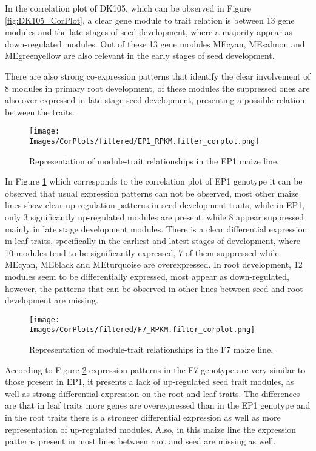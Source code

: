 \documentclass[
]{article}
\begin{document}
In the correlation plot of DK105, which can be observed in Figure \ref{fig:DK105_CorPlot}, a
clear gene module to trait relation is between 13 gene modules and the
late stages of seed development, where a majority appear as
down-regulated modules. Out of these 13 gene modules MEcyan, MEsalmon
and MEgreenyellow are also relevant in the early stages of seed
development.

There are also strong co-expression patterns that identify the clear
involvement of 8 modules in primary root development, of these modules
the suppressed ones are also over expressed in late-stage seed
development, presenting a possible relation between the traits.

\begin{figure}[H]
  \centering
  \texttt{[image: Images/CorPlots/filtered/EP1\_RPKM.filter\_corplot.png]}
  \caption[EP1 Correlation Plot]{\small Representation of module-trait relationships in the EP1 maize line.}
    \label{fig:EP1_CorPlot}
\end{figure}

In Figure \ref{fig:EP1_CorPlot} which corresponds to the correlation plot of EP1 genotype
it can be observed that usual expression patterns can not be observed,
most other maize lines show clear up-regulation patterns in seed
development traits, while in EP1, only 3 significantly up-regulated
modules are present, while 8 appear suppressed mainly in late stage
development modules. There is a clear differential expression in leaf
traits, specifically in the earliest and latest stages of development,
where 10 modules tend to be significantly expressed, 7 of them
suppressed while MEcyan, MEblack and MEturquoise are overexpressed. In
root development, 12 modules seem to be differentially expressed, most
appear as down-regulated, however, the patterns that can be observed in
other lines between seed and root development are missing.

\begin{figure}[H]
  \centering
  \texttt{[image: Images/CorPlots/filtered/F7\_RPKM.filter\_corplot.png]}
  \caption[F7 Correlation Plot]{\small Representation of module-trait relationships in the F7 maize line.}
    \label{fig:F7_CorPlot}
\end{figure}

According to Figure \ref{fig:F7_CorPlot} expression patterns in the F7 genotype are very
similar to those present in EP1, it presents a lack of up-regulated seed
trait modules, as well as strong differential expression on the root and
leaf traits. The differences are that in leaf traits more genes are
overexpressed than in the EP1 genotype and in the root traits there is a
stronger differential expression as well as more representation of
up-regulated modules. Also, in this maize line the expression patterns
present in most lines between root and seed are missing as well.
\end{document}
